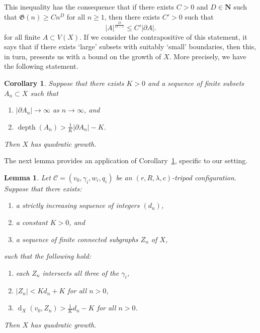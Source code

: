 \documentclass[11pt,a4paper]{amsart}
\DeclareMathOperator{\dist}{d}
\newcommand{\N}{\mathbf{N}}
\newtheorem{lemma}[theorem]{Lemma}
\newtheorem{corollary}[theorem]{Corollary}
\theoremstyle{definition}
\newcommand{\crosshair}{\mathcal{C}}
\DeclareMathOperator{\depth}{depth}
\newcommand{\growth}{\mathfrak{G}}
\begin{document}
This inequality has the consequence that if there exists $C >0$ and $D \in \N$ such that $\growth(n) \geq Cn^D$ for all $n \geq 1$, then there exists $C'> 0$ such that 
$$
|A|^{\frac{D}{D-1}} \leq C' |\partial A|.
$$
for all finite  $A \subset V(X)$. 
If we consider the contrapositive of this statement, it says that if there exists `large' subsets with suitably `small' boundaries, then this, in turn, presents us with a bound on the growth of $X$. More precisely, we have the following statement.

\begin{corollary}\label{cor:varopoulos}
    Suppose that there exists $K > 0$ and a sequence of finite subsets $A_n \subset X$ such that
    \begin{enumerate}
        \item $|\partial A_n| \to \infty$ as $n \to \infty$, and
        \item $ \depth(A_n) > \frac 1 K|\partial A_n| - K$.
    \end{enumerate}
    Then $X$ has quadratic growth. 
\end{corollary}


The next lemma provides an application of Corollary~\ref{cor:varopoulos}, specific to our setting. 

\begin{lemma}\label{lem:paths-on-crossexaminer-give-quadgrowth}
    Let $\crosshair = (v_0, \gamma_i,w_i, q_i)$ be an $(r,R,\lambda,c)$-tripod configuration. Suppose that there exists:
    \begin{enumerate}
        \item a strictly increasing sequence of integers $(d_n)$,

        \item a constant $K > 0$, and

        \item a sequence of finite connected subgraphs $Z_n$ of $X$,
    \end{enumerate}
    such that the following hold:
    \begin{enumerate}
        \item each $Z_n$ intersects all three of the $\gamma_i$,

        \item $|Z_n| < Kd_n + K$ for all $n > 0$,

        \item $\dist_X(v_0,Z_n) > \frac 1 Kd_n-K$ for all $n > 0$.
    \end{enumerate}
    Then $X$ has quadratic growth.
\end{lemma}
\end{document}
